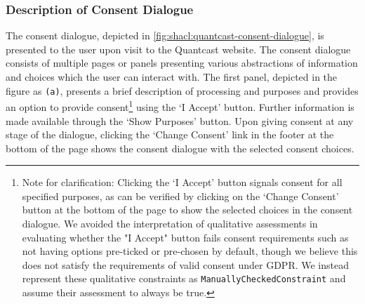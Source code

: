 \subsubsection{Description of Consent Dialogue}
The consent dialogue, depicted in \autoref{fig:shacl:quantcast-consent-dialogue}, is presented to the user upon visit to the Quantcast website. The consent dialogue consists of multiple pages or panels presenting various abstractions of information and choices which the user can interact with.
The first panel, depicted in the figure as \texttt{(a)}, presents a brief description of processing and purposes and provides an option to provide consent\footnote{Note for clarification: Clicking the `I Accept' button signals consent for all specified purposes, as can be verified by clicking on the `Change Consent' button at the bottom of the page to show the selected choices in the consent dialogue. We avoided the interpretation of qualitative assessments in evaluating whether the "I Accept" button fails consent requirements such as not having options pre-ticked or pre-chosen by default, though we believe this does not satisfy the requirements of valid consent under GDPR. We instead represent these qualitative constraints as \texttt{ManuallyCheckedConstraint} and assume their assessment to always be true.} using the `I Accept' button. Further information is made available through the `Show Purposes' button. Upon giving consent at any stage of the dialogue, clicking the `Change Consent' link in the footer at the bottom of the page shows the consent dialogue with the selected consent choices.
